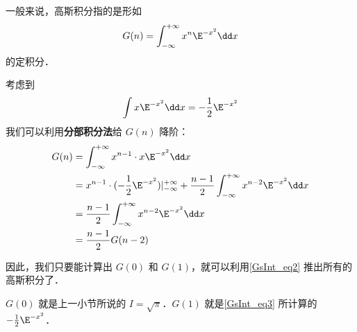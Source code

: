 一般来说，高斯积分指的是形如
\begin{equation}
G(n)=\int_{-\infty}^{+\infty} x^n\E^{-x^2}\dd x
\end{equation}
的定积分．

考虑到
\begin{equation}\label{GsInt_eq3}
\int x\E^{-x^2}\dd x=-\frac{1}{2}\E^{-x^2}
\end{equation}
我们可以利用\textbf{分部积分法}给 $G(n)$ 降阶：
\begin{equation}\label{GsInt_eq2}
\begin{aligned}
G(n)&=\int_{-\infty}^{+\infty} x^{n-1}\cdot x\E^{-x^2}\dd x\\
&=x^{n-1}\cdot(-\frac{1}{2}\E^{-x^2})|_{-\infty}^{+\infty}+\frac{n-1}{2}\int_{-\infty}^{+\infty} x^{n-2}\E^{-x^2}\dd x\\
&=\frac{n-1}{2}\int_{-\infty}^{+\infty} x^{n-2}\E^{-x^2}\dd x\\
&=\frac{n-1}{2}G(n-2)
\end{aligned}
\end{equation}

因此，我们只要能计算出 $G(0)$ 和 $G(1)$，就可以利用\autoref{GsInt_eq2} 推出所有的高斯积分了．

$G(0)$ 就是上一小节所说的 $I=\sqrt{\pi}$．$G(1)$ 就是\autoref{GsInt_eq3} 所计算的 $-\frac{1}{2}\E^{-x^2}$．









